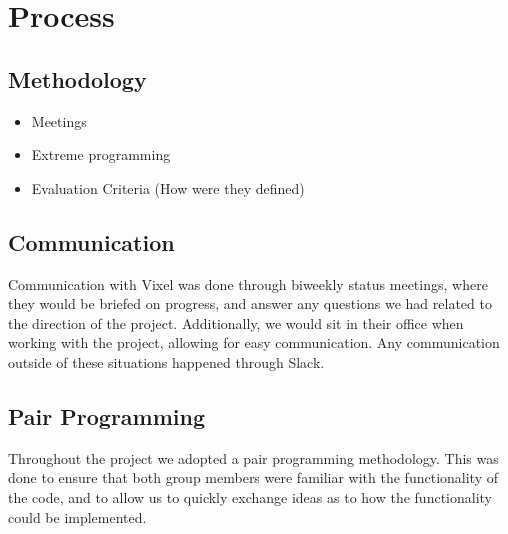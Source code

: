 \section{Process}
\subsection{Methodology}
\begin{itemize}
    \item Meetings
    \item Extreme programming
    \item Evaluation Criteria (How were they defined)
\end{itemize}

\subsection{Communication}
Communication with Vixel was done through biweekly status meetings, where they would be briefed on progress, and answer any questions we had related to the direction of the project. Additionally, we would sit in their office when working with the project, allowing for easy communication. Any communication outside of these situations happened through Slack.

\subsection{Pair Programming}
Throughout the project we adopted a pair programming methodology. This was done to ensure that both group members were familiar with the functionality of the code, and to allow us to quickly exchange ideas as to how the functionality could be implemented.
